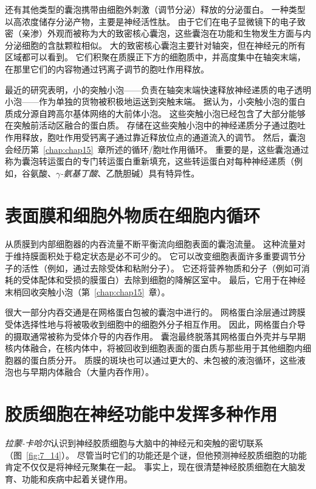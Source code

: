还有其他类型的囊泡携带由细胞外刺激（调节分泌）释放的分泌蛋白。
一种类型以高浓度储存分泌产物，主要是神经活性肽。
由于它们在电子显微镜下的电子致密（亲渗）外观而被称为大的致密核心囊泡，这些囊泡在功能和生物发生方面与内分泌细胞的含肽颗粒相似。
大的致密核心囊泡主要针对轴突，但在神经元的所有区域都可以看到。
它们积聚在质膜正下方的细胞质中，并高度集中在轴突末端，在那里它们的内容物通过钙离子调节的胞吐作用释放。


最近的研究表明，小的突触小泡——负责在轴突末端快速释放神经递质的电子透明小泡——作为单独的货物被积极地运送到突触末端。
据认为，小突触小泡的蛋白质成分源自跨高尔基体网络的大前体小泡。
这些突触小泡已经包含了大部分能够在突触前活动区融合的蛋白质。
存储在这些突触小泡中的神经递质分子通过胞吐作用释放，胞吐作用受钙离子通过靠近释放位点的通道流入的调节。
然后，囊泡会经历第~\ref{chap:chap15}~章所述的循环/胞吐作用循环。
重要的是，这些囊泡通过称为囊泡转运蛋白的专门转运蛋白重新填充，这些转运蛋白对每种神经递质（例如，谷氨酸、\textit{$\gamma$-氨基丁酸}、乙酰胆碱）具有特异性。



\section{表面膜和细胞外物质在细胞内循环}

从质膜到内部细胞器的内吞流量不断平衡流向细胞表面的囊泡流量。
这种流量对于维持膜面积处于稳定状态是必不可少的。
它可以改变细胞表面许多重要调节分子的活性（例如，通过去除受体和粘附分子）。
它还将营养物质和分子（例如可消耗的受体配体和受损的膜蛋白）去除到细胞的降解区室中。
最后，它用于在神经末梢回收突触小泡（第~\ref{chap:chap15}~章）。


很大一部分内吞交通是在网格蛋白包被的囊泡中进行的。 
网格蛋白涂层通过跨膜受体选择性地与将被吸收到细胞中的细胞外分子相互作用。
因此，网格蛋白介导的摄取通常被称为受体介导的内吞作用。
囊泡最终脱落其网格蛋白外壳并与早期核内体融合，在核内体中，将被回收到细胞表面的蛋白质与那些用于其他细胞内细胞器的蛋白质分开。
质膜的斑块也可以通过更大的、未包被的液泡循环，这些液泡也与早期内体融合（大量内吞作用）。



\section{胶质细胞在神经功能中发挥多种作用}

\textit{拉蒙-卡哈尔}认识到神经胶质细胞与大脑中的神经元和突触的密切联系（图~\ref{fig:7_14}）。 
尽管当时它们的功能还是个谜，但他预测神经胶质细胞的功能肯定不仅仅是将神经元聚集在一起。
事实上，现在很清楚神经胶质细胞在大脑发育、功能和疾病中起着关键作用。


